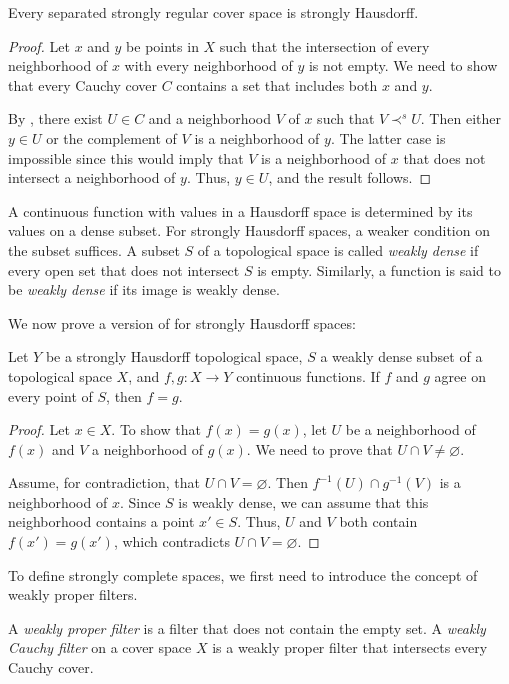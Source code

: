 \documentclass[reqno]{amsart}
\theoremstyle{definition}
\theoremstyle{remark}
\numberwithin{figure}{section}
\newcommand{\rb}{\prec}
\begin{document}
\begin{lem}
Every separated strongly regular cover space is strongly Hausdorff.
\end{lem}
\begin{proof}
Let $x$ and $y$ be points in $X$ such that the intersection of every neighborhood of $x$ with every neighborhood of $y$ is not empty.
We need to show that every Cauchy cover $C$ contains a set that includes both $x$ and $y$. 

By , there exist $U \in C$ and a neighborhood $V$ of $x$ such that $V \rb^s U$.
Then either $y \in U$ or the complement of $V$ is a neighborhood of $y$.
The latter case is impossible since this would imply that $V$ is a neighborhood of $x$ that does not intersect a neighborhood of $y$.
Thus, $y \in U$, and the result follows.
\end{proof}

A continuous function with values in a Hausdorff space is determined by its values on a dense subset.
For strongly Hausdorff spaces, a weaker condition on the subset suffices.
A subset $S$ of a topological space is called \emph{weakly dense} if every open set that does not intersect $S$ is empty.
Similarly, a function is said to be \emph{weakly dense} if its image is weakly dense. 

We now prove a version of  for strongly Hausdorff spaces:

\begin{prop}
Let $Y$ be a strongly Hausdorff topological space, $S$ a weakly dense subset of a topological space $X$, and $f,g : X \to Y$ continuous functions.
If $f$ and $g$ agree on every point of $S$, then $f = g$.
\end{prop}
\begin{proof}
Let $x \in X$.
To show that $f(x) = g(x)$, let $U$ be a neighborhood of $f(x)$ and $V$ a neighborhood of $g(x)$.
We need to prove that $U \cap V \neq \varnothing$. 

Assume, for contradiction, that $U \cap V = \varnothing$.
Then $f^{-1}(U) \cap g^{-1}(V)$ is a neighborhood of $x$.
Since $S$ is weakly dense, we can assume that this neighborhood contains a point $x' \in S$.
Thus, $U$ and $V$ both contain $f(x') = g(x')$, which contradicts $U \cap V = \varnothing$.
\end{proof}

To define strongly complete spaces, we first need to introduce the concept of weakly proper filters.

\begin{defn}
A \emph{weakly proper filter} is a filter that does not contain the empty set.
A \emph{weakly Cauchy filter} on a cover space $X$ is a weakly proper filter that intersects every Cauchy cover.
\end{defn}
\end{document}
